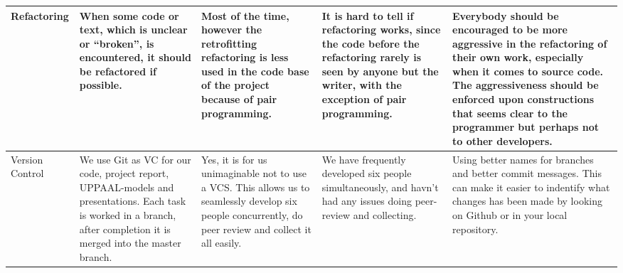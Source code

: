\begin{sidewaystable}[]
\begin{tabularx}{\textwidth}{|l|X|X|X|X|}
Refactoring      & When some code or text, which is unclear or “broken”, is encountered, it should be refactored if possible.                                                                                                                  & Most of the time, however the retrofitting refactoring is less used in the code base of the project because of pair programming.                                                                                                                                & It is hard to tell if refactoring works, since the code before the refactoring rarely is seen by anyone but the writer, with the exception of pair programming.                                                                                                                                                                                                                    & Everybody should be encouraged to be more aggressive in the refactoring of their own work, especially when it comes to source code. The aggressiveness should be enforced upon constructions that seems clear to the programmer but perhaps not to other developers.                            \\ \hline
Version Control  & We use Git as VC for our code, project report, UPPAAL-models and presentations. Each task is worked in a branch, after completion it is merged into the master branch.                                                      & Yes, it is for us unimaginable not to use a VCS. This allows us to seamlessly develop six people concurrently, do peer review and collect it all easily.                                                                                                        & We have frequently developed six people simultaneously, and havn’t had any issues doing peer-review and collecting.                                                                                                                                                                                                                                                                & Using better names for branches and better commit messages. This can make it easier to indentify what changes has been made by looking on Github or in your local repository.                                                                                                                   \\ \hline

\end{tabularx}
\end{sidewaystable}
